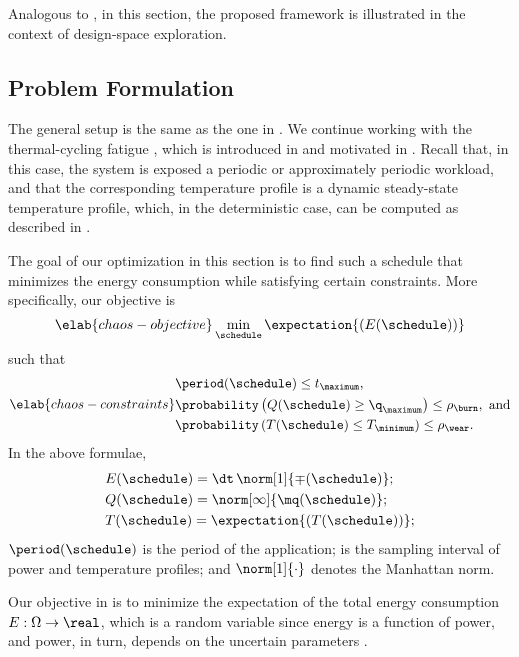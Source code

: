 Analogous to , in this section, the proposed
framework is illustrated in the context of design-space exploration.

\subsection{Problem Formulation}

The general setup is the same as the one in . We
continue working with the thermal-cycling fatigue \cite{jedec2016}, which is
introduced in  and motivated in
. Recall that, in this case, the system is
exposed a periodic or approximately periodic workload, and that the
corresponding temperature profile is a dynamic steady-state temperature profile,
which, in the deterministic case, can be computed as described in
.

The goal of our optimization in this section is to find such a schedule
\schedule that minimizes the energy consumption while satisfying certain
constraints. More specifically, our objective is
\begin{equation} \elab{chaos-objective}
  \min_{\schedule} \expectation{(E(\schedule))}
\end{equation}
such that
\begin{equation} \elab{chaos-constraints}
  \begin{split}
    & \period(\schedule) \leq t_\maximum, \\
    & \probability\left(Q(\schedule) \geq \q_\maximum\right) \leq \rho_\burn, \text{ and} \\
    & \probability\left(T(\schedule) \leq T_\minimum\right) \leq \rho_\wear.
  \end{split}
\end{equation}
In the above formulae,
\begin{align*}
  & E(\schedule) = \dt \, \norm[1]{\mp(\schedule)}; \\
  & Q(\schedule) = \norm[\infty]{\mq(\schedule)}; \\
  & T(\schedule) = \expectation{\left(T(\schedule)\right)};
\end{align*}
$\period(\schedule)$ is the period of the application; \dt is the sampling
interval of power and temperature profiles; and $\norm[1]{\cdot}$ denotes the
Manhattan norm.

Our objective in  is to minimize the expectation of the
total energy consumption $E: \Omega \to \real$, which is a random variable since
energy is a function of power, and power, in turn, depends on the uncertain
parameters \vu.

